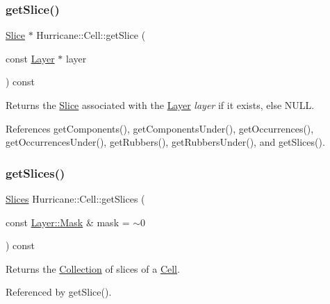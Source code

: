 \subsubsection{\texorpdfstring{get\+Slice()}{getSlice()}}
{\footnotesize\ttfamily \hyperlink{classHurricane_1_1Slice}{Slice} $\ast$ Hurricane\+::\+Cell\+::get\+Slice (\begin{DoxyParamCaption}\item[{const \hyperlink{classHurricane_1_1Layer}{Layer} $\ast$}]{layer }\end{DoxyParamCaption}) const\hspace{0.3cm}{\ttfamily [inline]}}

Returns the \hyperlink{classHurricane_1_1Slice}{Slice} associated with the \hyperlink{classHurricane_1_1Layer}{Layer} {\itshape layer} if it exists, else {\ttfamily N\+U\+LL}. 

References get\+Components(), get\+Components\+Under(), get\+Occurrences(), get\+Occurrences\+Under(), get\+Rubbers(), get\+Rubbers\+Under(), and get\+Slices().

\mbox{\label{classHurricane_1_1Cell_aba933a81e3cacfc05b7bd1660e2a933a}} 
\subsubsection{\texorpdfstring{get\+Slices()}{getSlices()}}
{\footnotesize\ttfamily \hyperlink{namespaceHurricane_aa4a7e8a563c5687621eb5e57ade1706a}{Slices} Hurricane\+::\+Cell\+::get\+Slices (\begin{DoxyParamCaption}\item[{const \hyperlink{classHurricane_1_1Layer_af5277c670637bd5d910237e7afe01a91}{Layer\+::\+Mask} \&}]{mask = {\ttfamily $\sim$0} }\end{DoxyParamCaption}) const}

Returns the \hyperlink{classHurricane_1_1Collection}{Collection} of slices of a \hyperlink{classHurricane_1_1Cell}{Cell}. 

Referenced by get\+Slice().

\mbox{\label{classHurricane_1_1Cell_a56395a189898d5ae2a869d5a5d5dfdbe}} 
